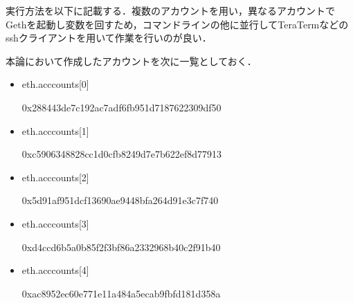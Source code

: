 \begin{lstlisting}[basicstyle=\ttfamily\footnotesize, frame=single]
\end{lstlisting}
実行方法を以下に記載する．複数のアカウントを用い，異なるアカウントでGethを起動し変数を回すため，コマンドラインの他に並行してTeraTermなどのsshクライアントを用いて作業を行いのが良い．

本論において作成したアカウントを次に一覧としておく．
\begin{itemize}
\item eth.acccounts[0]

0x288443de7c192ac7adf6fb951d7187622309df50
\item eth.acccounts[1]

0xc5906348828cc1d0cfb8249d7e7b622ef8d77913
\item eth.acccounts[2]

0x5d91af951dcf13690ae9448bfa264d91e3c7f740
\item eth.acccounts[3]

0xd4ccd6b5a0b85f2f3bf86a2332968b40c2f91b40
\item eth.acccounts[4]

0xac8952ec60e771e11a484a5ecab9fbfd181d358a
\end{itemize}

